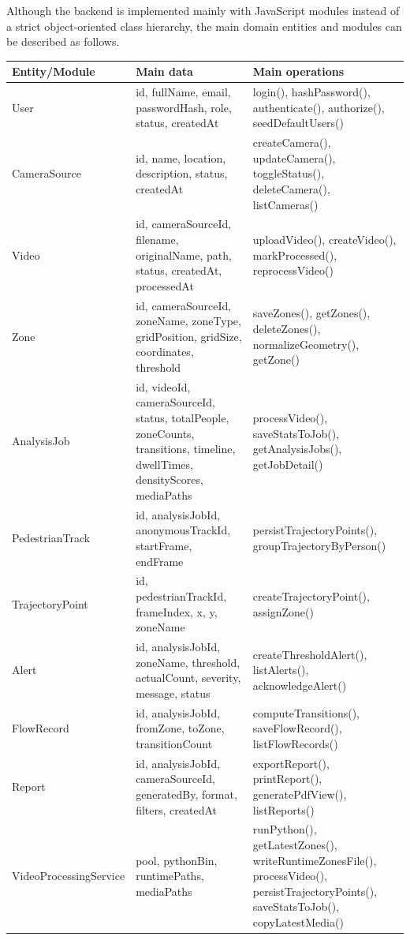 \documentclass[12pt,a4paper]{report}
\begin{document}
Although the backend is implemented mainly with JavaScript modules instead of a strict object-oriented class hierarchy, the main domain entities and modules can be described as follows.

\begin{longtable}{|p{4cm}|p{5cm}|p{5cm}|}
\hline
\rowcolor{HeaderBlue}
\textbf{Entity/Module} & \textbf{Main data} & \textbf{Main operations} \\
\hline
User & id, fullName, email, passwordHash, role, status, createdAt & login(), hashPassword(), authenticate(), authorize(), seedDefaultUsers() \\
\hline
CameraSource & id, name, location, description, status, createdAt & createCamera(), updateCamera(), toggleStatus(), deleteCamera(), listCameras() \\
\hline
Video & id, cameraSourceId, filename, originalName, path, status, createdAt, processedAt & uploadVideo(), createVideo(), markProcessed(), reprocessVideo() \\
\hline
Zone & id, cameraSourceId, zoneName, zoneType, gridPosition, gridSize, coordinates, threshold & saveZones(), getZones(), deleteZones(), normalizeGeometry(), getZone() \\
\hline
AnalysisJob & id, videoId, cameraSourceId, status, totalPeople, zoneCounts, transitions, timeline, dwellTimes, densityScores, mediaPaths & processVideo(), saveStatsToJob(), getAnalysisJobs(), getJobDetail() \\
\hline
PedestrianTrack & id, analysisJobId, anonymousTrackId, startFrame, endFrame & persistTrajectoryPoints(), groupTrajectoryByPerson() \\
\hline
TrajectoryPoint & id, pedestrianTrackId, frameIndex, x, y, zoneName & createTrajectoryPoint(), assignZone() \\
\hline
Alert & id, analysisJobId, zoneName, threshold, actualCount, severity, message, status & createThresholdAlert(), listAlerts(), acknowledgeAlert() \\
\hline
FlowRecord & id, analysisJobId, fromZone, toZone, transitionCount & computeTransitions(), saveFlowRecord(), listFlowRecords() \\
\hline
Report & id, analysisJobId, cameraSourceId, generatedBy, format, filters, createdAt & exportReport(), printReport(), generatePdfView(), listReports() \\
\hline
VideoProcessingService & pool, pythonBin, runtimePaths, mediaPaths & runPython(), getLatestZones(), writeRuntimeZonesFile(), processVideo(), persistTrajectoryPoints(), saveStatsToJob(), copyLatestMedia() \\
\hline
\end{longtable}
\end{document}
